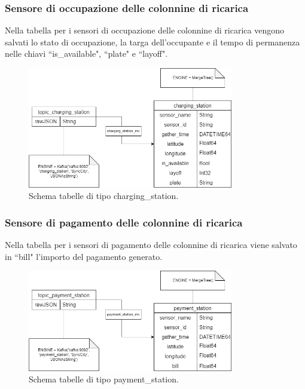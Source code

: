 \documentclass[8pt]{article}
\begin{document}
\subsubsection{Sensore di occupazione delle colonnine di ricarica}
Nella tabella per i sensori di occupazione delle colonnine di ricarica vengono salvati lo stato di occupazione, la targa dell'occupante e il tempo di permanenza nelle chiavi ``is\_available", ``plate" e ``layoff".
\begin{figure}[h!]
    \centering
    \includegraphics[width=0.8\textwidth]{images_st/tabelle_charging_station.png}
    \caption{Schema tabelle di tipo charging\_station.}
    \label{fig:Schema tabelle di tipo charging_station}
\end{figure}
\subsubsection{Sensore di pagamento delle colonnine di ricarica}
Nella tabella per i sensori di pagamento delle colonnine di ricarica viene salvato in ``bill" l'importo del pagamento generato.
\begin{figure}[h!]
    \centering
    \includegraphics[width=0.8\textwidth]{images_st/tabelle_payment_station.png}
    \caption{Schema tabelle di tipo payment\_station.}
    \label{fig:Schema tabelle di tipo payment_station}
\end{figure}
\clearpage
\end{document}
